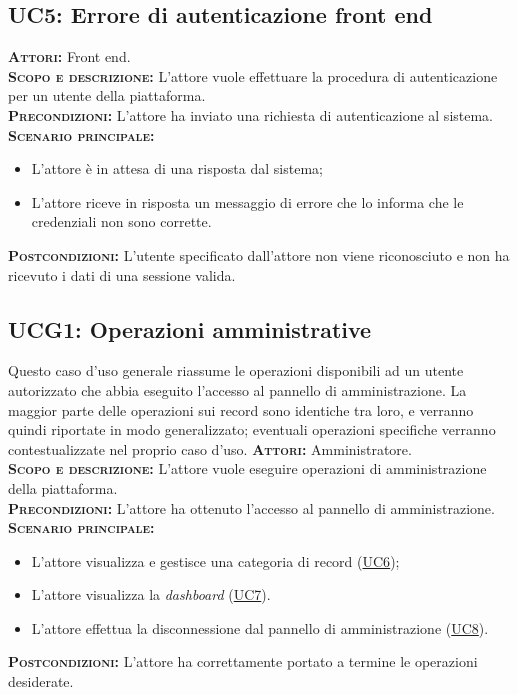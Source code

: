 \subsection{UC5: Errore di autenticazione front end}
\label{sec:UC5}
\textsc{\textbf{Attori:}} Front end.\\
\textsc{\textbf{Scopo e descrizione:}} L'attore vuole effettuare la procedura di autenticazione per un utente della piattaforma.\\
\textsc{\textsc{\textbf{Precondizioni:}}} L'attore ha inviato una richiesta di autenticazione al sistema.\\
\textsc{\textbf{Scenario principale:}} 
\begin{itemize}
    \item L'attore è in attesa di una risposta dal sistema;
    \item L'attore riceve in risposta un messaggio di errore che lo informa che le credenziali non sono corrette.
\end{itemize}
\textsc{\textbf{Postcondizioni:}} L'utente specificato dall'attore non viene riconosciuto e non ha ricevuto i dati di una sessione valida.

\subsection{UCG1: Operazioni amministrative}
\label{sec:ucg1}
Questo caso d'uso generale riassume le operazioni disponibili ad un utente autorizzato che abbia eseguito l'accesso al pannello di amministrazione. La maggior parte delle operazioni sui record sono identiche tra loro, e verranno quindi riportate in modo generalizzato; eventuali operazioni specifiche verranno contestualizzate nel proprio caso d'uso.
\textsc{\textbf{Attori:}} Amministratore.\\
\textsc{\textbf{Scopo e descrizione:}} L'attore vuole eseguire operazioni di amministrazione della piattaforma.\\
\textsc{\textsc{\textbf{Precondizioni:}}} L'attore ha ottenuto l'accesso al pannello di amministrazione.\\
\textsc{\textbf{Scenario principale:}} 
\begin{itemize}
    \item L'attore visualizza e gestisce una categoria di record (\hyperref[sec:UC6]{UC6});
    \item L'attore visualizza la \textit{dashboard} (\hyperref[sec:UC7]{UC7}).
    \item L'attore effettua la disconnessione dal pannello di amministrazione (\hyperref[sec:UC8]{UC8}).
\end{itemize}
\textsc{\textbf{Postcondizioni:}} L'attore ha correttamente portato a termine le operazioni desiderate.


